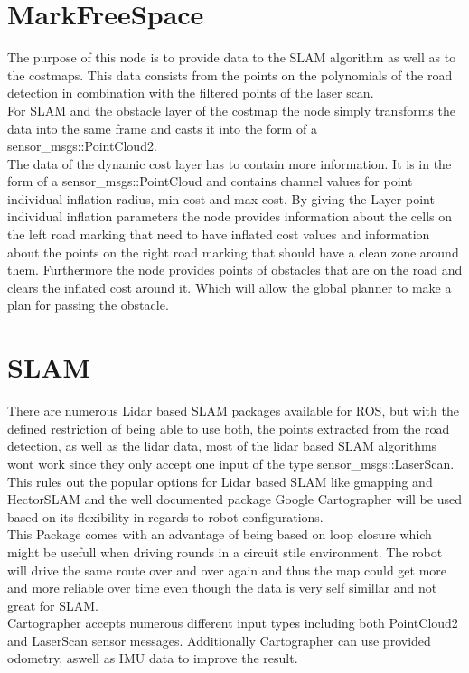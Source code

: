 \section{MarkFreeSpace}

The purpose of this node is to provide data to the SLAM algorithm as well as to the costmaps. This data consists from the points on the polynomials of the road detection in combination with the filtered points of the laser scan.\\

For SLAM and the obstacle layer of the costmap the node simply transforms the data into the same frame and casts it into the form of a sensor\_msgs::PointCloud2.\\

The data of the dynamic cost layer has to contain more information. It is in the form of a sensor\_msgs::PointCloud and contains channel values for point individual inflation radius, min-cost and max-cost. By giving the Layer point individual inflation parameters the node provides information about the cells on the left road marking that need to have inflated cost values and information about the points on the right road marking that should have a clean zone around them. Furthermore the node provides points of obstacles that are on the road and clears the inflated cost around it. Which will allow the global planner to make a plan for passing the obstacle.

\section{SLAM}
There are numerous Lidar based SLAM packages available for ROS, but with the defined restriction of being able to use both, the points extracted from the road detection, as well as the lidar data, most of the lidar based SLAM algorithms wont work since they only accept one input of  the type sensor\_msgs::LaserScan.\\
This rules out the popular options for Lidar based SLAM like gmapping and HectorSLAM and the well documented package Google Cartographer will be used based on its flexibility in regards to robot configurations.\\
This Package comes with an advantage of being based on loop closure which might be usefull when driving rounds in a circuit stile environment. The robot will drive the same route over and over again and thus the map could get more and more reliable over time even though the data is very self simillar and not great for SLAM.\\

Cartographer accepts numerous different input types including both PointCloud2 and LaserScan sensor messages. Additionally Cartographer can use provided odometry, aswell as IMU data to improve the result.\\








